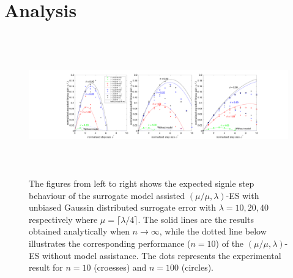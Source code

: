 





\section{Analysis}
\begin{center}
\begin{figure}
\includegraphics[height=2.4in, width=6.1in]{expectedFitGain_v1}
\caption{The figures from left to right shows the expected signle step behaviour of the surrogate model assisted $(\mu/\mu,\lambda)$-ES with unbiased Gaussin distributed surrogate error with $\lambda=10,20,40$ respectively where $\mu = \lceil \lambda/4 \rceil$. The solid lines are the results obtained analytically when $n \rightarrow \infty$, while the dotted line below illustrates the corresponding performance ($n=10$) of the $(\mu/\mu,\lambda)$-ES without model assistance. The dots represents the experimental result for $n=10$ (croesses) and $n=100$ (circles).}
\label{fig:expectedFitGain}
\end{figure}
\end{center}

